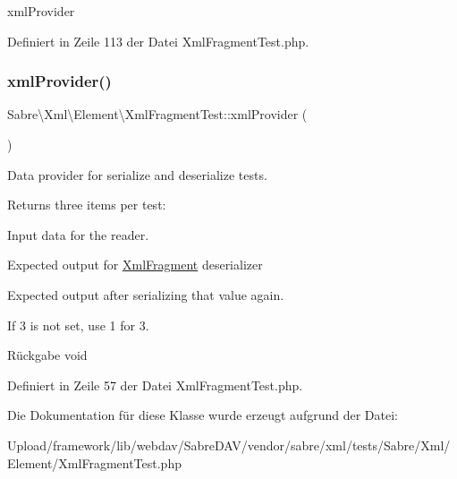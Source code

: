 xml\+Provider 

Definiert in Zeile 113 der Datei Xml\+Fragment\+Test.\+php.

\mbox{\label{class_sabre_1_1_xml_1_1_element_1_1_xml_fragment_test_a747d4b9957d75133458bade9db5d545b}} 
\subsubsection{\texorpdfstring{xml\+Provider()}{xmlProvider()}}
{\footnotesize\ttfamily Sabre\textbackslash{}\+Xml\textbackslash{}\+Element\textbackslash{}\+Xml\+Fragment\+Test\+::xml\+Provider (\begin{DoxyParamCaption}{ }\end{DoxyParamCaption})}

Data provider for serialize and deserialize tests.

Returns three items per test\+:


\begin{DoxyEnumerate}
\item Input data for the reader.
\item Expected output for \mbox{\hyperlink{class_sabre_1_1_xml_1_1_element_1_1_xml_fragment}{Xml\+Fragment}} deserializer
\item Expected output after serializing that value again.
\end{DoxyEnumerate}

If 3 is not set, use 1 for 3.

\begin{DoxyReturn}{Rückgabe}
void 
\end{DoxyReturn}


Definiert in Zeile 57 der Datei Xml\+Fragment\+Test.\+php.



Die Dokumentation für diese Klasse wurde erzeugt aufgrund der Datei\+:\begin{DoxyCompactItemize}
\item 
Upload/framework/lib/webdav/\+Sabre\+D\+A\+V/vendor/sabre/xml/tests/\+Sabre/\+Xml/\+Element/Xml\+Fragment\+Test.\+php\end{DoxyCompactItemize}
